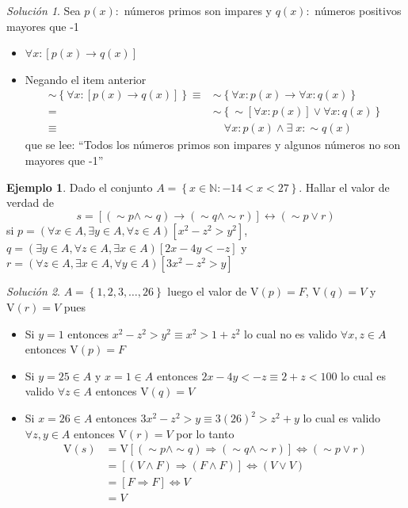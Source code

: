 \documentclass[
  16pt,
]{krantz}
\providecommand{\tightlist}{%
  \setlength{\itemsep}{0pt}\setlength{\parskip}{0pt}}
\theoremstyle{definition}
\theoremstyle{definition}
\newtheorem{example}{Ejemplo}[chapter]
\theoremstyle{definition}
\theoremstyle{definition}
\theoremstyle{remark}
\newtheorem*{solution}{Solución}
\begin{document}
\begin{solution}

Sea \(p(x):\) números primos son impares y \(q(x):\) números positivos mayores que -1

\begin{itemize}
\item
  \(\forall x:[p(x)\rightarrow q(x)]\)
\item
  Negando el item anterior
  \[
  \begin{aligned}
  \sim\left\{\forall x:[p(x)\rightarrow q(x)]\right\}
  \equiv& \sim\left\{\forall x:p(x)\rightarrow \forall x:q(x)\right\}\\
  =&\sim\left\{\sim[\forall x:p(x)]\vee \forall x:q(x)\right\}\\
  \equiv&\quad\forall x:p(x)\wedge \exists\; x:\sim q(x)
  \end{aligned}
  \]
  que se lee: ``Todos los números primos son impares y algunos números no son mayores que -1''
\end{itemize}

\end{solution}

\begin{example}
\protect\hypertarget{exm:wwwwwwwu}{}\label{exm:wwwwwwwu}Dado el conjunto \(A=\left\{x\in\mathbb{N}:-14<x<27\right\}\). Hallar el valor de verdad de
\[
s=[(\sim p\wedge \sim q)\rightarrow(\sim q\wedge \sim r)]\leftrightarrow(\sim p\vee r)
\]
si
\(p=(\forall x\in A, \exists y\in A, \forall z\in A)[x^2-z^2>y^2]\), \(q=(\exists y\in A, \forall z\in A, \exists x \in A)[2x-4y<-z]\) y \(r=(\forall z\in A, \exists x\in A, \forall y \in A)[3x^2-z^2>y]\)
\end{example}

\begin{solution}

\(A=\left\{1,2,3,\ldots,26\right\}\) luego el valor de \(\text{V}(p)=F\), \(\text{V}(q)=V\) y \(\text{V}(r)=V\) pues

\begin{itemize}
\tightlist
\item
  Si \(y=1\) entonces \(x^2-z^2>y^2\equiv x^2>1+z^2\) lo cual no es valido \(\forall x,z\in A\) entonces \(\text{V}(p)=F\)
\item
  Si \(y=25\in A\) y \(x=1\in A\) entonces \(2x-4y<-z\equiv 2+z<100\) lo cual es valido \(\forall z\in A\) entonces \(\text{V}(q)=V\)
\item
  Si \(x=26\in A\) entonces \(3x^2-z^2>y\equiv3(26)^2>z^2+y\) lo cual es valido \(\forall z,y\in A\) entonces \(\text{V}(r)=V\) por lo tanto
  \[
  \begin{aligned}
  \text{V}(s)&=\text{V}[(\sim p\wedge \sim q)\Longrightarrow(\sim q\wedge \sim r)]\Longleftrightarrow(\sim p\vee r)\\
  &=[(V\wedge F)\Longrightarrow(F\wedge F)]\Longleftrightarrow(V\vee V)\\
  &=[F\Longrightarrow F]\Longleftrightarrow V\\
  &=V
  \end{aligned}
  \]
\end{itemize}

\end{solution}
\end{document}
